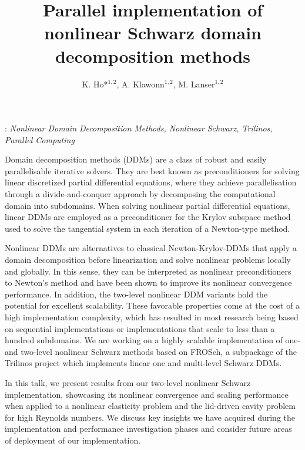 \documentclass[12pt]{eccomas-2024}
\title{Parallel implementation of nonlinear Schwarz domain decomposition methods\\}
\author{K. Ho*$^{1,2}$, A. Klawonn$^{1,2}$, M. Lanser$^{1,2}$}
\begin{document}
: {\it  Nonlinear Domain Decomposition Methods, Nonlinear Schwarz, Trilinos, Parallel Computing}
\vskip0.5cm

Domain decomposition methods (DDMs) are a class of robust and easily parallelisable iterative solvers. They are best known as preconditioners for solving linear discretized partial differential equations, where they achieve parallelisation through a divide-and-conquer approach by decomposing the computational domain into subdomains. When solving nonlinear partial differential equations, linear DDMs are employed as a preconditioner for the Krylov subspace method used to solve the tangential system in each iteration of a Newton-type method. 

Nonlinear DDMs are alternatives to classical Newton-Krylov-DDMs that apply a domain decomposition before linearization and solve nonlinear problems locally and globally. In this sense, they can be interpreted as nonlinear preconditioners to Newton's method and have been shown to improve its nonlinear convergence performance. In addition, the two-level nonlinear DDM variants hold the potential for excellent scalability. These favorable properties come at the cost of a high implementation complexity, which has resulted in most research being based on sequential implementations or implementations that scale to less than a hundred subdomains. We are working on a highly scalable implementation of one- and two-level nonlinear Schwarz methods based on FROSch, a subpackage of the Trilinos project which implements linear one and multi-level Schwarz DDMs.

In this talk, we present results from our two-level nonlinear Schwarz implementation, showcasing its nonlinear convergence and scaling performance when applied to a nonlinear elasticity problem and the lid-driven cavity problem for high Reynolds numbers. We discuss key insights we have acquired during the implementation and performance investigation phases and consider future areas of deployment of our implementation.

\end{document}
